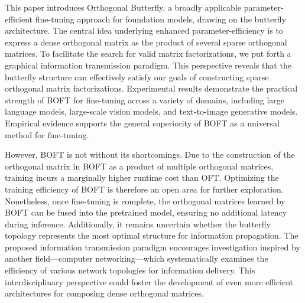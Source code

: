 This paper introduces Orthogonal Butterfly, a broadly applicable parameter-efficient fine-tuning approach for foundation models, drawing on the butterfly architecture. The central idea underlying enhanced parameter-efficiency is to express a dense orthogonal matrix as the product of several sparse orthogonal matrices. To facilitate the search for valid matrix factorizations, we put forth a graphical information transmission paradigm. This perspective reveals that the butterfly structure can effectively satisfy our goals of constructing sparse orthogonal matrix factorizations. Experimental results demonstrate the practical strength of BOFT for fine-tuning across a variety of domains, including large language models, large-scale vision models, and text-to-image generative models. Empirical evidence supports the general superiority of BOFT as a universal method for fine-tuning.

However, BOFT is not without its shortcomings. Due to the construction of the orthogonal matrix in BOFT as a product of multiple orthogonal matrices, training incurs a marginally higher runtime cost than OFT. Optimizing the training efficiency of BOFT is therefore an open area for further exploration. Nonetheless, once fine-tuning is complete, the orthogonal matrices learned by BOFT can be fused into the pretrained model, ensuring no additional latency during inference. Additionally, it remains uncertain whether the butterfly topology represents the most optimal structure for information propagation. The proposed information transmission paradigm encourages investigation inspired by another field—computer networking—which systematically examines the efficiency of various network topologies for information delivery. This interdisciplinary perspective could foster the development of even more efficient architectures for composing dense orthogonal matrices.